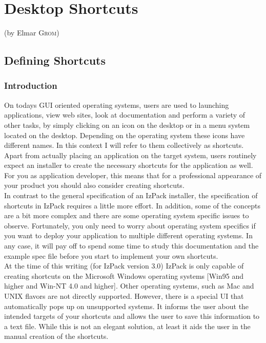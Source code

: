 

\chapter{Desktop Shortcuts} (by Elmar \textsc{Grom})\\

\section{Defining Shortcuts}

\subsection{Introduction}

On todays GUI oriented operating systems, users are used to launching
applications, view web sites, look at documentation and perform a
variety of other tasks, by simply clicking on an icon on the desktop or
in a menu system located on the desktop. Depending on the operating
system these icons have different names. In this context I will refer to
them collectively as shortcuts.\\

Apart from actually placing an application on the target system, users
routinely expect an installer to create the necessary shortcuts for the
application as well. For you as application developer, this means that
for a professional appearance of your product you should also
consider creating shortcuts.\\

In contrast to the general specification of an IzPack installer, the
specification of shortcuts in IzPack requires a little more effort. In
addition, some of the concepts are a bit more complex and there are some
operating system specific issues to observe. Fortunately, you only need
to worry about operating system specifics if you want to deploy your
application to multiple different operating systems. In any case, it
will pay off to spend some time to study this documentation and the
example spec file before you start to implement your own shortcuts.\\

At the time of this writing (for IzPack version 3.0) IzPack is only
capable of creating shortcuts on the Microsoft Windows operating systems
[Win95 and higher and Win-NT 4.0 and higher]. Other operating systems,
such as Mac and UNIX flavors are not directly supported. However, there
is a special UI that automatically pops up on unsupported systems. It
informs the user about the intended targets of your shortcuts and allows
the user to save this information to a text file. While this is not an
elegant solution, at least it aids the user in the manual creation of
the shortcuts.\\

